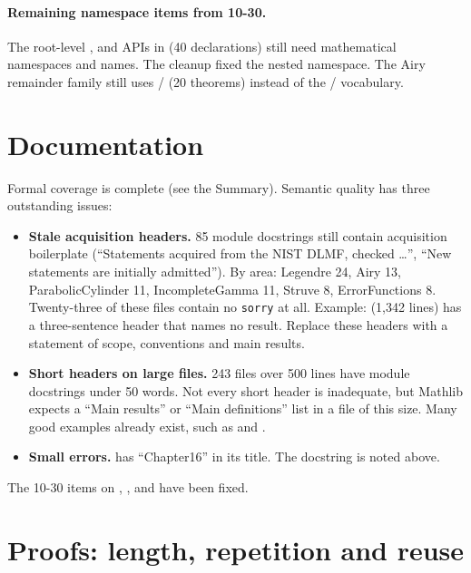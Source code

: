 \documentclass[11pt,a4paper]{article}
\begin{document}
\paragraph{Remaining namespace items from 10-30.}
The root-level ,  and  APIs in 
(40 declarations) still need mathematical namespaces and names. The cleanup fixed the
nested  namespace. The Airy remainder family
still uses / (20 theorems) instead of the
/ vocabulary.

\section{Documentation}

Formal coverage is complete (see the Summary). Semantic quality has three outstanding
issues:
\begin{itemize}
  \item \textbf{Stale acquisition headers.} 85 module docstrings still contain acquisition
    boilerplate (``Statements acquired from the NIST DLMF, checked \ldots'', ``New statements
    are initially admitted''). By area: Legendre 24, Airy 13, ParabolicCylinder 11,
    IncompleteGamma 11, Struve 8, ErrorFunctions 8. Twenty-three of these files contain no
    \texttt{sorry} at all. Example:  (1{,}342 lines) has a
    three-sentence header that names no result. Replace these headers with a statement of
    scope, conventions and main results.
  \item \textbf{Short headers on large files.} 243 files over 500 lines have module
    docstrings under 50 words. Not every short header is inadequate, but Mathlib expects a
    ``Main results'' or ``Main definitions'' list in a file of this size. Many good examples
    already exist, such as  and .
  \item \textbf{Small errors.}  has
    ``Chapter16'' in its title. The  docstring is noted above.
\end{itemize}
The 10-30 items on , ,
 and  have
been fixed.

\section{Proofs: length, repetition and reuse}
\end{document}
